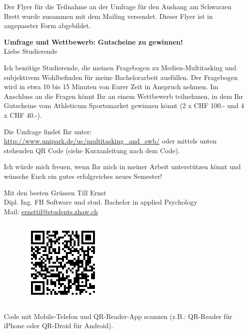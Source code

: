 \begin{RaggedRight}
Der Flyer für die Teilnahme an der Umfrage für den Aushang am Schwarzen Brett wurde zusammen mit dem Mailing versendet. Dieser Flyer ist in angepasster Form abgebildet.
\par
\textbf{Umfrage und Wettbewerb: Gutscheine zu gewinnen!}\\
Liebe Studierende

Ich benötige Studierende, die meinen Fragebogen zu Medien-Multitasking und subjektivem Wohlbefinden für meine Bachelorarbeit ausfüllen. Der Fragebogen wird in etwa 10 bis 15 Minuten von Eurer Zeit in Anspruch nehmen. Im Anschluss an die Fragen könnt Ihr an einem Wettbewerb teilnehmen, in dem Ihr Gutscheine vom Athleticum Sportsmarket gewinnen könnt (2 x CHF 100.- und 4 x CHF 40.-).

Die Umfrage findet Ihr unter: \url{http://www.unipark.de/uc/multitasking_and_swb/} oder mittels unten stehenden QR Code (siehe Kurzanleitung nach dem Code).

Ich würde mich freuen, wenn Ihr mich in meiner Arbeit unterstützen könnt und wünsche Euch ein gutes erfolgreiches neues Semester!

Mit den besten Grüssen
Till Ernst\\
Dipl. Ing. FH Software und stud. Bachelor in applied Psychology\\
Mail: \href{mailto:ernsttil@students.zhaw.ch}{ernsttil@students.zhaw.ch}\\
\begin{figure}[h]
    \centering
    \includegraphics[scale=0.5]{images/anhang/umfrage_qr_code.png}
\end{figure}
Code mit Mobile-Telefon und QR-Reader-App scannen (z.B.: QR-Reader für iPhone oder QR-Droid für Android).
\end{RaggedRight}
